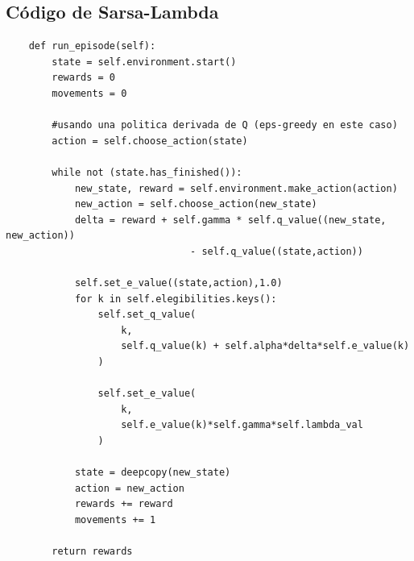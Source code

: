 \documentclass[11pt, a4paper]{article}
\begin{document}
\subsection{Código de Sarsa-Lambda}
\begin{verbatim}
    def run_episode(self):
        state = self.environment.start()
        rewards = 0
        movements = 0
        
        #usando una politica derivada de Q (eps-greedy en este caso)
        action = self.choose_action(state)
                
        while not (state.has_finished()):
            new_state, reward = self.environment.make_action(action)
            new_action = self.choose_action(new_state)
            delta = reward + self.gamma * self.q_value((new_state, new_action)) 
                                - self.q_value((state,action))
            
            self.set_e_value((state,action),1.0)
            for k in self.elegibilities.keys():
                self.set_q_value(
                    k, 
                    self.q_value(k) + self.alpha*delta*self.e_value(k)
                )
                
                self.set_e_value(
                    k, 
                    self.e_value(k)*self.gamma*self.lambda_val
                )

            state = deepcopy(new_state)
            action = new_action
            rewards += reward
            movements += 1
        
        return rewards
\end{verbatim}
\end{document}
